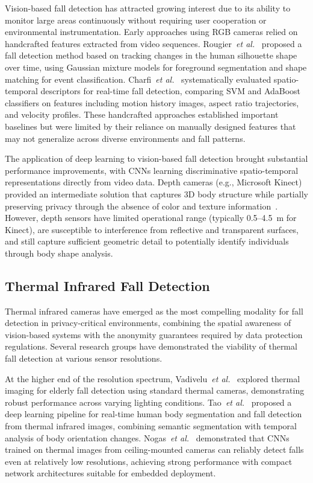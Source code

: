 Vision-based fall detection has attracted growing interest due to its ability to monitor large areas continuously without requiring user cooperation or environmental instrumentation. Early approaches using RGB cameras relied on handcrafted features extracted from video sequences. Rougier~\emph{et al.}~\cite{rougier2011robust} proposed a fall detection method based on tracking changes in the human silhouette shape over time, using Gaussian mixture models for foreground segmentation and shape matching for event classification. Charfi~\emph{et al.}~\cite{charfi2013optimized} systematically evaluated spatio-temporal descriptors for real-time fall detection, comparing SVM and AdaBoost classifiers on features including motion history images, aspect ratio trajectories, and velocity profiles. These handcrafted approaches established important baselines but were limited by their reliance on manually designed features that may not generalize across diverse environments and fall patterns.

The application of deep learning to vision-based fall detection brought substantial performance improvements, with CNNs learning discriminative spatio-temporal representations directly from video data. Depth cameras (e.g., Microsoft Kinect) provided an intermediate solution that captures 3D body structure while partially preserving privacy through the absence of color and texture information~\cite{mastorakis2014fall}. However, depth sensors have limited operational range (typically 0.5--4.5~m for Kinect), are susceptible to interference from reflective and transparent surfaces, and still capture sufficient geometric detail to potentially identify individuals through body shape analysis.

\subsection*{Thermal Infrared Fall Detection}

Thermal infrared cameras have emerged as the most compelling modality for fall detection in privacy-critical environments, combining the spatial awareness of vision-based systems with the anonymity guarantees required by data protection regulations. Several research groups have demonstrated the viability of thermal fall detection at various sensor resolutions.

At the higher end of the resolution spectrum, Vadivelu~\emph{et al.}~\cite{vadivelu2016thermal} explored thermal imaging for elderly fall detection using standard thermal cameras, demonstrating robust performance across varying lighting conditions. Tao~\emph{et al.}~\cite{tao2018real} proposed a deep learning pipeline for real-time human body segmentation and fall detection from thermal infrared images, combining semantic segmentation with temporal analysis of body orientation changes. Nogas~\emph{et al.}~\cite{nogas2020fall} demonstrated that CNNs trained on thermal images from ceiling-mounted cameras can reliably detect falls even at relatively low resolutions, achieving strong performance with compact network architectures suitable for embedded deployment.

